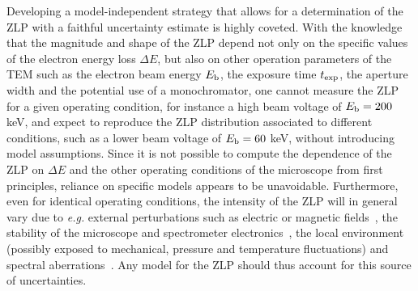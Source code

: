 Developing a model-independent strategy that allows for a determination of the ZLP
with a faithful uncertainty estimate is highly coveted.
%
With the knowledge that the magnitude and shape of the ZLP depend
not only on the specific values
of the electron energy loss $\Delta E$, but also on other operation parameters
of the TEM such as the electron beam energy $E_{\rm b}$, the exposure time
$t_{\rm exp}$, the aperture width and the potential use of a monochromator,
one cannot measure the ZLP for a given operating
condition, for instance a high beam voltage of $E_{\rm b}=200$ keV, and expect to reproduce
the ZLP distribution
associated to different conditions, such as a lower beam voltage of $E_{\rm b}=60$ keV,
without introducing model assumptions.
%
Since it is not possible to compute the dependence of the ZLP on $\Delta E$
and the other operating conditions of the microscope from first principles,
reliance on specific models appears to be unavoidable.
%
Furthermore, even for identical operating conditions, 
the intensity of the ZLP will in general vary due to {\it e.g.} external perturbations 
such as electric or magnetic fields~\cite{Rafferty:2000},
the stability of the microscope and spectrometer electronics~\cite{Kothleitner:2003}, 
the local environment (possibly exposed to mechanical, pressure and temperature fluctuations) 
and spectral aberrations~\cite{Egerton:1996}. 
%
Any model for the ZLP should thus account for this source of uncertainties.




